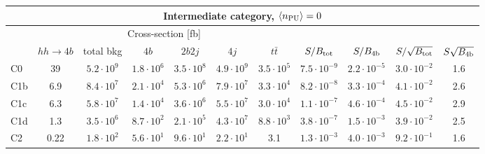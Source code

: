 \begin{tabular}{|l|cc|cccc|cccc|}
  \hline
\multicolumn{11}{|c|}{Intermediate category, $\left\langle n_{\rm PU}\right\rangle=0$}\\
\hline
&  \multicolumn{6}{c|}{Cross-section [fb]} &  &  & &  \\
   &  $hh\to 4b$ &  total bkg  &   $4b$    &  $2b2j$   &   $4j$    &
$t\bar{t}$ &
$S/B_{\rm tot}$ & $S/B_{\rm 4b}$ & $S/\sqrt{B_{\rm tot}}$ & $S\sqrt{B_{\rm 4b}}$ \\
  \hline
  \hline
 C0      & 39  &   $5.2\cdot 10^9$   & $1.8\cdot 10^6$ & $3.5\cdot 10^8$ & $4.9\cdot 10^9$ & $3.5\cdot 10^5$ &  $7.5\cdot 10^{-9}$   & $2.2\cdot 10^{-5}$   &   $3.0\cdot 10^{-2}$   & 1.6  \\
 C1b     & 6.9  &   $8.4\cdot 10^7$   & $2.1\cdot 10^4$ & $5.3\cdot 10^6$ & $7.9\cdot 10^7$ & $3.3\cdot 10^4$ &  $8.2\cdot 10^{-8}$   & $3.3\cdot 10^{-4}$ &   $4.1\cdot 10^{-2}$   & 2.6 \\
 C1c     & 6.3  &   $5.8\cdot 10^7$   & $1.4\cdot 10^4$ & $3.6\cdot 10^6$ & $5.5\cdot 10^7$ & $3.0\cdot 10^4$ &  $1.1\cdot 10^{-7}$   & $4.6\cdot 10^{-4}$ &   $4.5\cdot 10^{-2}$   & 2.9\\
 C1d     & 1.3  &   $3.5\cdot 10^6$   & $8.7\cdot 10^2$ & $2.1\cdot 10^5$ & $4.3\cdot 10^7$ & $8.8\cdot 10^3$ &  $3.8\cdot 10^{-7}$   & $1.5\cdot 10^{-3}$  &   $3.9\cdot 10^{-2}$   & 2.5\\
 C2      & 0.22  &   $1.8\cdot 10^2$   & $5.6\cdot 10^1$ & $9.6\cdot 10^1$ & $2.2\cdot 10^1$ & 3.1 & $1.3\cdot 10^{-3}$   & $4.0\cdot 10^{-3}$  &   $9.2\cdot 10^{-1}$   & 1.6 \\
\hline
\end{tabular}
